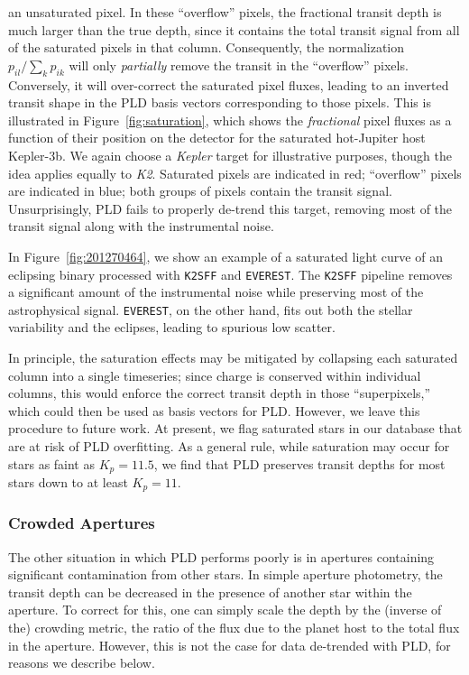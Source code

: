 \documentclass[]{emulateapj}
\begin{document}
an unsaturated pixel. In these ``overflow'' pixels, the fractional transit
depth is much larger than the true depth, since it contains the total transit signal
from all of the saturated pixels in that column. Consequently, the normalization
$p_{il} / \sum_k{p_{ik}}$ will only \emph{partially} remove the transit in the
``overflow'' pixels. Conversely, it will over-correct the saturated pixel fluxes,
leading to an inverted transit shape in the PLD basis vectors corresponding to 
those pixels. This is illustrated in Figure~\ref{fig:saturation}, which shows the 
\emph{fractional} pixel fluxes as a function of their position on the detector for the saturated
hot-Jupiter host Kepler-3b. We again choose a \emph{Kepler} target for illustrative
purposes, though the idea applies equally to \emph{K2}. Saturated pixels are indicated in red; ``overflow'' pixels
are indicated in blue; both groups of pixels contain the transit signal. Unsurprisingly, 
PLD fails to properly de-trend this target, removing most of the transit signal
along with the instrumental noise.

In Figure~\ref{fig:201270464}, we show an example of a saturated light curve of an eclipsing
binary processed with \texttt{K2SFF} and \texttt{EVEREST}. The \texttt{K2SFF} pipeline removes
a significant amount of the instrumental noise while preserving most of the astrophysical signal.
\texttt{EVEREST}, on the other hand, fits out both the stellar variability and the eclipses,
leading to spurious low scatter.

In principle, the saturation effects may be mitigated by collapsing each saturated column
into a single timeseries; since charge is conserved within individual columns, this would enforce
the correct transit depth in those ``superpixels,'' which could then be used as basis
vectors for PLD. However, we leave this procedure to future work. At present, we flag
saturated stars in our database that are at risk of PLD overfitting. As a general rule, 
while saturation may occur for stars as faint as $K_p = 11.5$, we find that PLD preserves transit
depths for most stars down to at least $K_p = 11$.

\subsubsection{Crowded Apertures}
\label{sec:crowded}
The other situation in which PLD performs poorly is in apertures containing significant
contamination from other stars. In simple aperture photometry, the transit depth
can be decreased in the presence of another star within the aperture. To correct for 
this, one can simply scale the depth by the (inverse of the) crowding metric, the ratio of 
the flux due to the planet host to the total flux in the aperture. However, this is not
the case for data de-trended with PLD, for reasons we describe below.
\end{document}
